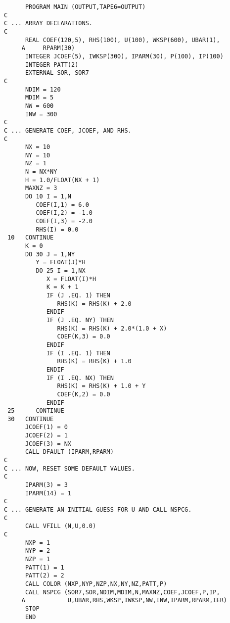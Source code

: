 \begin{verbatim}
      PROGRAM MAIN (OUTPUT,TAPE6=OUTPUT)
C
C ... ARRAY DECLARATIONS.
C
      REAL COEF(120,5), RHS(100), U(100), WKSP(600), UBAR(1),
     A     RPARM(30)
      INTEGER JCOEF(5), IWKSP(300), IPARM(30), P(100), IP(100)
      INTEGER PATT(2)
      EXTERNAL SOR, SOR7
C
      NDIM = 120
      MDIM = 5
      NW = 600
      INW = 300
C
C ... GENERATE COEF, JCOEF, AND RHS.
C
      NX = 10
      NY = 10
      NZ = 1
      N = NX*NY
      H = 1.0/FLOAT(NX + 1)
      MAXNZ = 3
      DO 10 I = 1,N 
         COEF(I,1) = 6.0
         COEF(I,2) = -1.0
         COEF(I,3) = -2.0
         RHS(I) = 0.0
 10   CONTINUE
      K = 0
      DO 30 J = 1,NY
         Y = FLOAT(J)*H
         DO 25 I = 1,NX
            X = FLOAT(I)*H
            K = K + 1
            IF (J .EQ. 1) THEN
               RHS(K) = RHS(K) + 2.0
            ENDIF
            IF (J .EQ. NY) THEN
               RHS(K) = RHS(K) + 2.0*(1.0 + X)
               COEF(K,3) = 0.0
            ENDIF
            IF (I .EQ. 1) THEN
               RHS(K) = RHS(K) + 1.0
            ENDIF
            IF (I .EQ. NX) THEN
               RHS(K) = RHS(K) + 1.0 + Y
               COEF(K,2) = 0.0
            ENDIF
 25      CONTINUE
 30   CONTINUE
      JCOEF(1) = 0
      JCOEF(2) = 1
      JCOEF(3) = NX 
      CALL DFAULT (IPARM,RPARM)
C
C ... NOW, RESET SOME DEFAULT VALUES.
C
      IPARM(3) = 3
      IPARM(14) = 1 
C
C ... GENERATE AN INITIAL GUESS FOR U AND CALL NSPCG.
C
      CALL VFILL (N,U,0.0)
C
      NXP = 1
      NYP = 2
      NZP = 1
      PATT(1) = 1
      PATT(2) = 2
      CALL COLOR (NXP,NYP,NZP,NX,NY,NZ,PATT,P)
      CALL NSPCG (SOR7,SOR,NDIM,MDIM,N,MAXNZ,COEF,JCOEF,P,IP,
     A            U,UBAR,RHS,WKSP,IWKSP,NW,INW,IPARM,RPARM,IER)
      STOP
      END 
\end{verbatim}
\newpage
